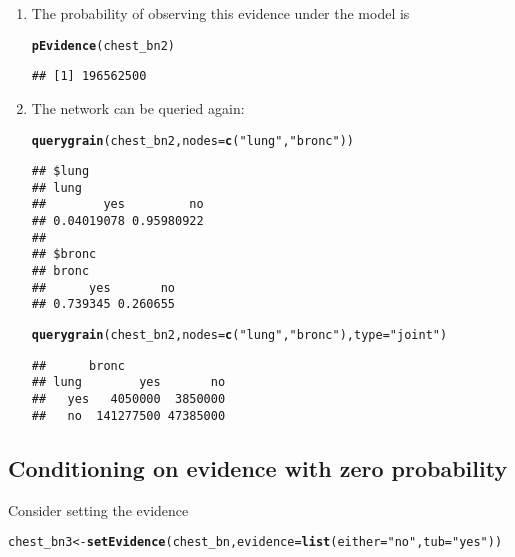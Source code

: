 \documentclass[10pt]{article}\usepackage[]{graphicx}\usepackage[]{color}
\makeatletter
\newcommand{\hlstr}[1]{\textcolor[rgb]{0.192,0.494,0.8}{#1}}%
\newcommand{\hlstd}[1]{\textcolor[rgb]{0.345,0.345,0.345}{#1}}%
\newcommand{\hlkwb}[1]{\textcolor[rgb]{0.69,0.353,0.396}{#1}}%
\newcommand{\hlkwc}[1]{\textcolor[rgb]{0.333,0.667,0.333}{#1}}%
\newcommand{\hlkwd}[1]{\textcolor[rgb]{0.737,0.353,0.396}{\textbf{#1}}}%
\newenvironment{kframe}{%
 \def\at@end@of@kframe{}%
 \ifinner\ifhmode%
  \def\at@end@of@kframe{\end{minipage}}%
  \begin{minipage}{\columnwidth}%
 \fi\fi%
 \def\FrameCommand##1{\hskip\@totalleftmargin \hskip-\fboxsep
 \colorbox{shadecolor}{##1}\hskip-\fboxsep
     \hskip-\linewidth \hskip-\@totalleftmargin \hskip\columnwidth}%
 \MakeFramed {\advance\hsize-\width
   \@totalleftmargin\z@ \linewidth\hsize
   \@setminipage}}%
 {\par\unskip\endMakeFramed%
 \at@end@of@kframe}
\newenvironment{knitrout}{}{} %
\makeatother
\begin{document}
\begin{enumerate}
\item The probability of observing this evidence under the model is
\begin{knitrout}
\color{fgcolor}\begin{kframe}
\begin{alltt}
\hlkwd{pEvidence}\hlstd{(chest_bn2)}
\end{alltt}
\begin{verbatim}
## [1] 196562500
\end{verbatim}
\end{kframe}
\end{knitrout}

\item The network can be queried again:

\begin{knitrout}
\color{fgcolor}\begin{kframe}
\begin{alltt}
\hlkwd{querygrain}\hlstd{(chest_bn2,} \hlkwc{nodes}\hlstd{=}\hlkwd{c}\hlstd{(}\hlstr{"lung"}\hlstd{,} \hlstr{"bronc"}\hlstd{))}
\end{alltt}
\begin{verbatim}
## $lung
## lung
##        yes         no 
## 0.04019078 0.95980922 
## 
## $bronc
## bronc
##      yes       no 
## 0.739345 0.260655
\end{verbatim}
\begin{alltt}
\hlkwd{querygrain}\hlstd{(chest_bn2,} \hlkwc{nodes}\hlstd{=}\hlkwd{c}\hlstd{(}\hlstr{"lung"}\hlstd{,} \hlstr{"bronc"}\hlstd{),} \hlkwc{type}\hlstd{=}\hlstr{"joint"}\hlstd{)}
\end{alltt}
\begin{verbatim}
##      bronc
## lung        yes       no
##   yes   4050000  3850000
##   no  141277500 47385000
\end{verbatim}
\end{kframe}
\end{knitrout}
\end{enumerate}






\subsection{Conditioning on evidence with zero probability}
\label{sec:zero-probabilities}

Consider setting the evidence
\begin{knitrout}
\color{fgcolor}\begin{kframe}
\begin{alltt}
\hlstd{chest_bn3} \hlkwb{<-} \hlkwd{setEvidence}\hlstd{(chest_bn,} \hlkwc{evidence}\hlstd{=}\hlkwd{list}\hlstd{(}\hlkwc{either}\hlstd{=}\hlstr{"no"}\hlstd{,} \hlkwc{tub}\hlstd{=}\hlstr{"yes"}\hlstd{))}
\end{alltt}
\end{kframe}
\end{knitrout}
\end{document}
